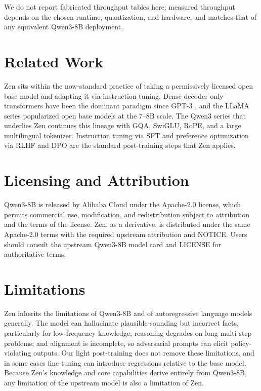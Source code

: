 \documentclass[11pt,a4paper]{article}
\begin{document}
We do not report fabricated throughput tables here; measured throughput depends on the chosen
runtime, quantization, and hardware, and matches that of any equivalent Qwen3-8B deployment.

\section{Related Work}

Zen sits within the now-standard practice of taking a permissively licensed open base model and
adapting it via instruction tuning. Dense decoder-only transformers have been the dominant paradigm
since GPT-3 \cite{brown2020gpt3}, and the LLaMA series \cite{touvron2023llama} popularized open base
models at the 7--8B scale. The Qwen3 series \cite{qwen3report} that underlies Zen continues this
lineage with GQA, SwiGLU, RoPE, and a large multilingual tokenizer. Instruction tuning via SFT
\cite{wei2022finetuned} and preference optimization via RLHF \cite{ouyang2022instructgpt} and DPO
\cite{rafailov2023dpo} are the standard post-training steps that Zen applies.

\section{Licensing and Attribution}

Qwen3-8B is released by Alibaba Cloud under the Apache-2.0 license, which permits commercial use,
modification, and redistribution subject to attribution and the terms of the license. Zen, as a
derivative, is distributed under the same Apache-2.0 terms with the required upstream attribution and
NOTICE. Users should consult the upstream Qwen3-8B model card and LICENSE for authoritative terms.

\section{Limitations}

Zen inherits the limitations of Qwen3-8B and of autoregressive language models generally. The model
can hallucinate plausible-sounding but incorrect facts, particularly for low-frequency knowledge;
reasoning degrades on long multi-step problems; and alignment is incomplete, so adversarial prompts
can elicit policy-violating outputs. Our light post-training does not remove these limitations, and
in some cases fine-tuning can introduce regressions relative to the base model. Because Zen's
knowledge and core capabilities derive entirely from Qwen3-8B, any limitation of the upstream model
is also a limitation of Zen.
\end{document}
